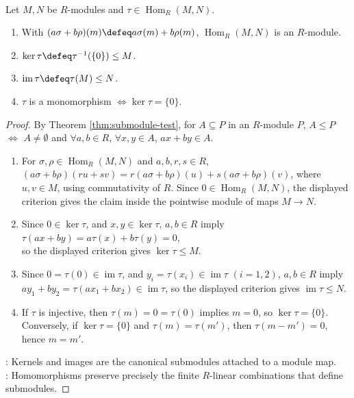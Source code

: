 \begin{proposition} \label{prop:hom-module-kernel-image} \\
Let $M,N$ be $R$-modules and $\tau\in\operatorname{Hom}_R(M,N)$.
\begin{enumerate}[label=(\roman*)]
\setlength{\itemsep}{0pt}
\item With $(a\sigma+b\rho)(m)\defeq a\sigma(m)+b\rho(m)$, $\operatorname{Hom}_R(M,N)$ is an $R$-module.
\item $\ker\tau\defeq\tau^{-1}(\{0\})\leq M$.
\item $\operatorname{im}\tau\defeq\tau(M)\leq N$.
\item $\tau$ is a monomorphism $\Longleftrightarrow\ker\tau=\{0\}$.
\end{enumerate}
\begin{proof} By Theorem \ref{thm:submodule-test}, for $A\subseteq P$ in an $R$-module $P$, $A\leq P$ $\Longleftrightarrow$ $A\neq\emptyset$ and $\forall a,b\in R$, $\forall x,y\in A$, $ax+by\in A$.
\begin{enumerate}[label=(\roman*)]
\setlength{\itemsep}{0pt}
\item For $\sigma,\rho\in\operatorname{Hom}_R(M,N)$ and $a,b,r,s\in R$, $(a\sigma+b\rho)(ru+sv) =r(a\sigma+b\rho)(u)+s(a\sigma+b\rho)(v)$, where $u,v\in M$, using commutativity of $R$. Since $0\in\operatorname{Hom}_R(M,N)$, the displayed criterion gives the claim inside the pointwise module of maps $M\to N$.
\item Since $0\in\ker\tau$, and $x,y\in\ker\tau$, $a,b\in R$ imply $\tau(ax+by)=a\tau(x)+b\tau(y)=0$,\\
so the displayed criterion gives $\ker\tau\leq M$.
\item Since $0=\tau(0)\in\operatorname{im}\tau$, and $y_i=\tau(x_i)\in\operatorname{im}\tau$ $(i=1,2)$, $a,b\in R$ imply $ay_1+by_2=\tau(ax_1+bx_2)\in\operatorname{im}\tau$, so the displayed criterion gives $\operatorname{im}\tau\leq N$.
\item If $\tau$ is injective, then $\tau(m)=0=\tau(0)$ implies $m=0$, so $\ker\tau=\{0\}$.\\
Conversely, if $\ker\tau=\{0\}$ and $\tau(m)=\tau(m')$, then $\tau(m-m')=0$, hence $m=m'$.
\end{enumerate}
: Kernels and images are the canonical submodules attached to a module map.\\
: Homomorphisms preserve precisely the finite $R$-linear combinations that define submodules.
\end{proof}
\end{proposition}


